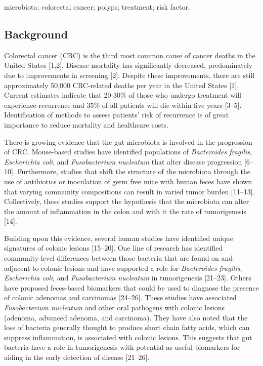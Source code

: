 \documentclass[12pt,]{article}
\begin{document}
microbiota; colorectal cancer; polyps; treatment; risk factor.

\newpage

\subsection{Background}\label{background}

Colorectal cancer (CRC) is the third most common cause of cancer deaths
in the United States {[}1,2{]}. Disease mortality has significantly
decreased, predominately due to improvements in screening {[}2{]}.
Despite these improvements, there are still approximately 50,000
CRC-related deaths per year in the United States {[}1{]}. Current
estimates indicate that 20-30\% of those who undergo treatment will
experience recurrence and 35\% of all patients will die within five
years {[}3--5{]}. Identification of methods to assess patients' risk of
recurrence is of great importance to reduce mortality and healthcare
costs.

There is growing evidence that the gut microbiota is involved in the
progression of CRC. Mouse-based studies have identified populations of
\emph{Bacteroides fragilis}, \emph{Escherichia coli}, and
\emph{Fusobacterium nucleatum} that alter disease progression
{[}6--10{]}. Furthermore, studies that shift the structure of the
microbiota through the use of antibiotics or inoculation of germ free
mice with human feces have shown that varying community compositions can
result in varied tumor burden {[}11--13{]}. Collectively, these studies
support the hypothesis that the microbiota can alter the amount of
inflammation in the colon and with it the rate of tumorigenesis
{[}14{]}.

Building upon this evidence, several human studies have identified
unique signatures of colonic lesions {[}15--20{]}. One line of research
has identified community-level differences between those bacteria that
are found on and adjacent to colonic lesions and have supported a role
for \emph{Bacteroides fragilis}, \emph{Escherichia coli}, and
\emph{Fusobacterium nucleatum} in tumorigenesis {[}21--23{]}. Others
have proposed feces-based biomarkers that could be used to diagnose the
presence of colonic adenomas and carcinomas {[}24--26{]}. These studies
have associated \emph{Fusobacterium nucleatum} and other oral pathogens
with colonic lesions (adenoma, advanced adenoma, and carcinoma). They
have also noted that the loss of bacteria generally thought to produce
short chain fatty acids, which can suppress inflammation, is associated
with colonic lesions. This suggests that gut bacteria have a role in
tumorigenesis with potential as useful biomarkers for aiding in the
early detection of disease {[}21--26{]}.
\end{document}
